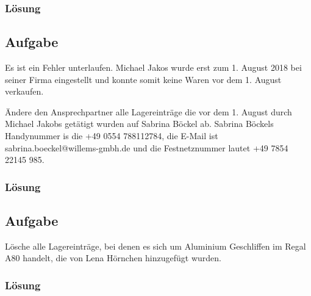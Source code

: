 \subsubsection*{Lösung}
\label{sec:uebung_02.aufgabe_06.loesung}

\subsection{Aufgabe}
\label{sec:uebung_02.aufgabe_07}
Es ist ein Fehler unterlaufen. Michael Jakos wurde erst zum 1. August 2018 bei seiner Firma eingestellt und konnte somit keine Waren vor dem 1. August verkaufen.

Ändere den Ansprechpartner alle Lagereinträge die vor dem 1. August durch Michael Jakobs getätigt wurden auf Sabrina Böckel ab. Sabrina Böckels Handynummer is die +49 0554 788112784, die E-Mail ist sabrina.boeckel@willems-gmbh.de und die Festnetznummer lautet +49 7854 22145 985.

\subsubsection*{Lösung}
\label{sec:uebung_02.aufgabe_07.loesung}

\subsection{Aufgabe}
\label{sec:uebung_02.aufgabe_08}
Lösche alle Lagereinträge, bei denen es sich um Aluminium Geschliffen im Regal A80 handelt, die von Lena Hörnchen hinzugefügt wurden.

\subsubsection*{Lösung}
\label{sec:uebung_02.aufgabe_08.loesung}
